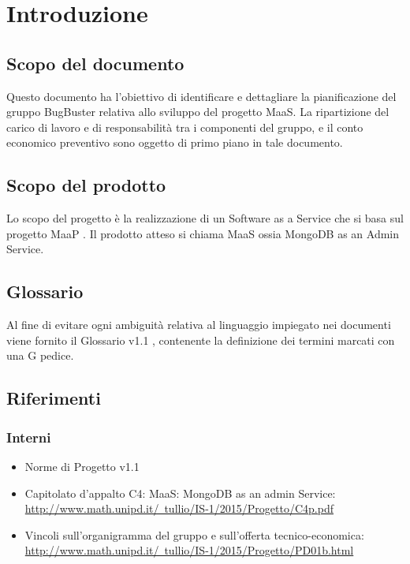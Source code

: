 \section{Introduzione}
\subsection{Scopo del documento}
Questo documento ha l’obiettivo di identificare e dettagliare la pianificazione del gruppo BugBuster
relativa allo sviluppo del progetto MaaS. La ripartizione del carico di lavoro e di responsabilità tra i
componenti del gruppo, e il conto economico preventivo sono oggetto di primo piano in tale documento.

\subsection{Scopo del prodotto}
Lo scopo del progetto è la realizzazione di un Software as a Service che si basa sul progetto MaaP . Il prodotto atteso si chiama MaaS ossia MongoDB as an Admin Service.

\subsection{Glossario}
Al fine di evitare ogni ambiguità relativa al linguaggio impiegato nei documenti viene fornito il Glossario
v1.1 , contenente la definizione dei termini marcati con una G pedice.

\subsection{Riferimenti}
\subsubsection{Interni}
\begin{itemize}
\item Norme di Progetto v1.1
\item Capitolato d'appalto C4: MaaS: MongoDB as an admin Service: \\ \hyperlink{http://www.math.unipd.it/~tullio/IS-1/2015/Progetto/C4p.pdf}{http://www.math.unipd.it/~tullio/IS-1/2015/Progetto/C4p.pdf} 
\item Vincoli sull’organigramma del gruppo e sull’offerta tecnico-economica: \\
\hyperlink{http://www.math.unipd.it/~tullio/IS-1/2015/Progetto/PD01b.html}{http://www.math.unipd.it/~tullio/IS-1/2015/Progetto/PD01b.html}
\end{itemize}
